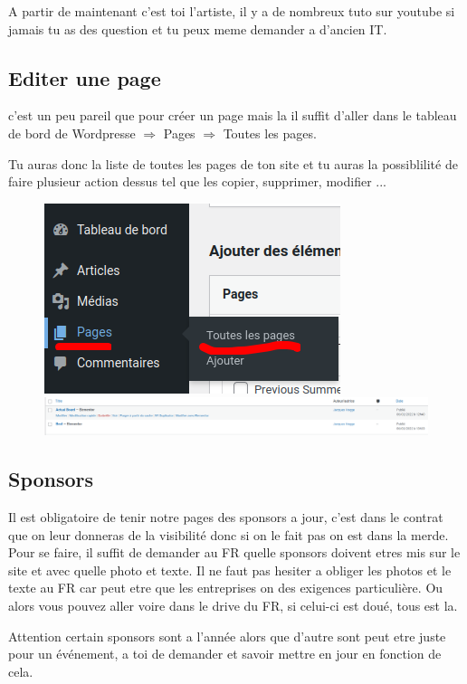 \documentclass[12pt]{article}
\begin{document}
		A partir de maintenant c'est toi l'artiste, il y a de nombreux tuto sur youtube si jamais tu as des question et tu peux meme demander a d'ancien IT.
		
	\subsection{Editer une page}
		c'est un peu pareil que pour créer un page mais la il suffit d'aller dans le tableau de bord de Wordpresse $\Rightarrow$ Pages $\Rightarrow$ Toutes les pages.
	
		Tu auras donc la liste de toutes les pages de ton site et tu auras la possiblilité de faire plusieur action dessus tel que les copier, supprimer, modifier ...
		
		\begin{figure}[htp]
			\centering
			\includegraphics[width=.6\textwidth]{img/EditPage.png}
			\includegraphics[width=.8\textwidth]{img/EditPage1.png}
		\end{figure}
		
	\subsection{Sponsors}
			
		Il est obligatoire de tenir notre pages des sponsors a jour, c'est dans le contrat que on leur donneras de la visibilité donc si on le fait pas on est dans la merde.
		Pour se faire, il suffit de demander au FR quelle sponsors doivent etres mis sur le site et avec quelle photo et texte. Il ne faut pas hesiter a obliger les photos et le texte au FR car peut etre que les entreprises on des exigences particulière. Ou alors vous pouvez aller voire dans le drive du FR, si celui-ci est doué, tous est la.
	
	Attention certain sponsors sont a l'année alors que d'autre sont peut etre juste pour un événement, a toi de demander et savoir mettre en jour en fonction de cela. 
	
\end{document}
